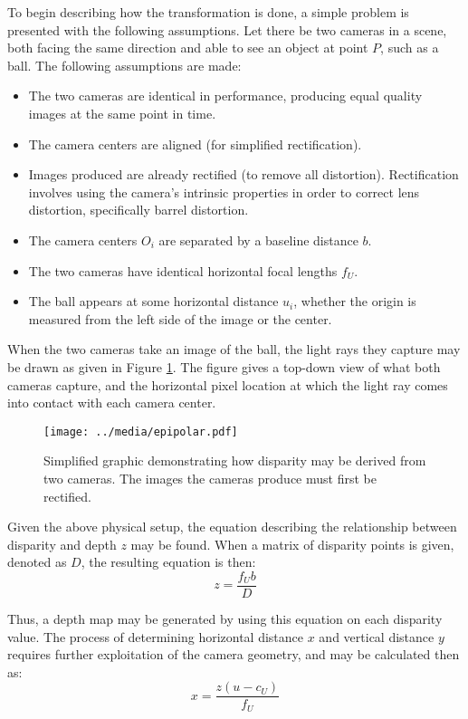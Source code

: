 To begin describing how the transformation is done, a simple problem is presented with the following assumptions. Let there be two cameras in a scene, both facing the same direction and able to see an object at point $P$, such as a ball. The following assumptions are made: 

\begin{itemize} \itemsep=-0.5em
	\item The two cameras are identical in performance, producing equal quality images at the same point in time.
	\item The camera centers are aligned (for simplified rectification).
	\item Images produced are already rectified (to remove all distortion). Rectification involves using the camera's intrinsic properties in order to correct lens distortion, specifically barrel distortion.
	\item The camera centers $O_i$ are separated by a baseline distance $b$.
	\item The two cameras have identical horizontal focal lengths $f_U$.
	\item The ball appears at some horizontal distance $u_i$, whether the origin is measured from the left side of the image or the center.
\end{itemize}

When the two cameras take an image of the ball, the light rays they capture may be drawn as given in Figure \ref{epipolar}. The figure gives a top-down view of what both cameras capture, and the horizontal pixel location at which the light ray comes into contact with each camera center. 

\begin{figure}[ht]
    \centering
	\texttt{[image: ../media/epipolar.pdf]}
	\caption{Simplified graphic demonstrating how disparity may be derived from two cameras. The images the cameras produce must first be rectified.}
	\label{epipolar}
\end{figure}

Given the above physical setup, the equation describing the relationship between disparity and depth $z$ may be found. When a matrix of disparity points is given, denoted as $D$, the resulting equation is then: 
\begin{equation}
z = \frac{f_U b}{D}
\label{eq_epi_z}
\end{equation}

Thus, a depth map may be generated by using this equation on each disparity value. The process of determining horizontal distance $x$ and vertical distance $y$ requires further exploitation of the camera geometry, and may be calculated then as: 
\begin{equation}
x = \frac{z (u - c_U)}{f_U}
\end{equation}

